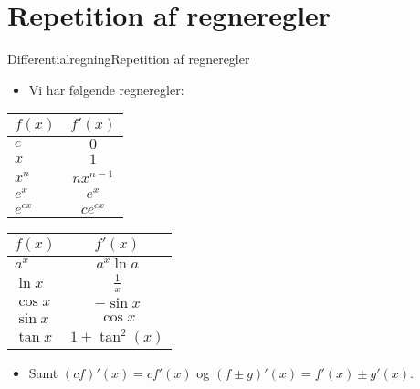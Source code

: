 \section{Repetition af regneregler}
\begin{frame}{Differentialregning}{Repetition af regneregler}
\begin{itemize}
	\setlength\itemsep{1em}
	\item Vi har følgende regneregler:
\end{itemize}
\begin{minipage}{0.49\textwidth}
	\centering
	\begin{tabular}{@{}l c@{}}
		$f(x)$      & $f'(x)$  				\\ \toprule
		$c$			& $0$ 					\\ \midrule
		$x$			& $1$					\\ \midrule
		$x^n$  		& $nx^{n-1}$			\\ \midrule
		$e^x$  		& $e^x$					\\ \midrule
		$e^{cx}$  	& $ce^{cx}$				\\ \bottomrule
	\end{tabular}
\end{minipage}
\begin{minipage}{0.49\textwidth}
	\centering
	\begin{tabular}{@{}l c@{}}
		$f(x)$      & $f'(x)$  				\\ \toprule
		$a^x$  		& $a^x\ln a $			\\ \midrule
		$\ln x$ 	& $\frac{1}{x}$			\\ \midrule
		$\cos x$  	& $-\sin x$				\\ \midrule
		$\sin x$  	& $\cos x$				\\ \midrule
		$\tan x$ 	& $1+\tan^2(x)$		\\ \bottomrule  
	\end{tabular}
\end{minipage}
\vspace{1em}
\begin{itemize}
	\setlength\itemsep{1em}
	\item<2-> Samt $(cf)'(x)=cf'(x)$ og $(f\pm g)'(x)=f'(x)\pm g'(x)$.
\end{itemize}
\end{frame}

